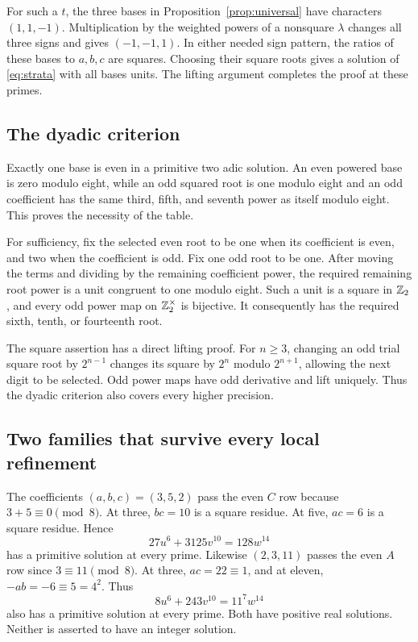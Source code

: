For such a $t$, the three bases in Proposition~\ref{prop:universal} have characters $(1,1,-1)$. Multiplication by the weighted powers of a nonsquare $\lambda$ changes all three signs and gives $(-1,-1,1)$. In either needed sign pattern, the ratios of these bases to $a,b,c$ are squares. Choosing their square roots gives a solution of \eqref{eq:strata} with all bases units. The lifting argument completes the proof at these primes.

\subsection{The dyadic criterion}
Exactly one base is even in a primitive two adic solution. An even powered base is zero modulo eight, while an odd squared root is one modulo eight and an odd coefficient has the same third, fifth, and seventh power as itself modulo eight. This proves the necessity of the table.

For sufficiency, fix the selected even root to be one when its coefficient is even, and two when the coefficient is odd. Fix one odd root to be one. After moving the terms and dividing by the remaining coefficient power, the required remaining root power is a unit congruent to one modulo eight. Such a unit is a square in $\mathbb Z_2$, and every odd power map on $\mathbb Z_2^\times$ is bijective. It consequently has the required sixth, tenth, or fourteenth root.

The square assertion has a direct lifting proof. For $n\ge3$, changing an odd trial square root by $2^{n-1}$ changes its square by $2^n$ modulo $2^{n+1}$, allowing the next digit to be selected. Odd power maps have odd derivative and lift uniquely. Thus the dyadic criterion also covers every higher precision.

\subsection{Two families that survive every local refinement}
The coefficients $(a,b,c)=(3,5,2)$ pass the even $C$ row because $3+5\equiv0\pmod8$. At three, $bc=10$ is a square residue. At five, $ac=6$ is a square residue. Hence
\[
27u^6+3125v^{10}=128w^{14}
\]
has a primitive solution at every prime. Likewise $(2,3,11)$ passes the even $A$ row since $3\equiv11\pmod8$. At three, $ac=22\equiv1$, and at eleven, $-ab=-6\equiv5=4^2$. Thus
\[
8u^6+243v^{10}=11^7w^{14}
\]
also has a primitive solution at every prime. Both have positive real solutions. Neither is asserted to have an integer solution.

